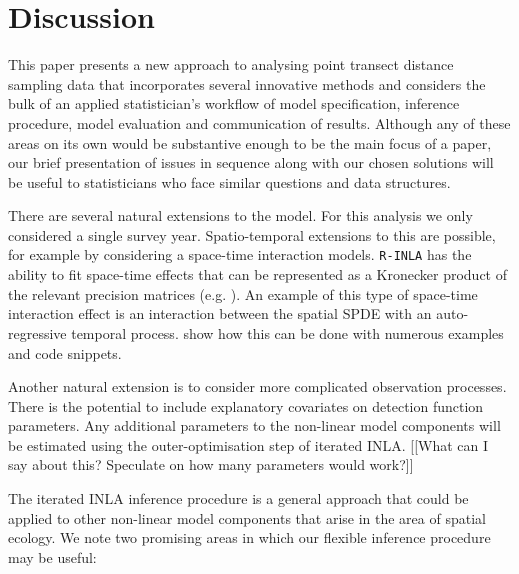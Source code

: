 \documentclass[preprint,12pt]{elsarticle}
\begin{document}
\section{Discussion}

This paper presents a new approach to analysing point transect distance sampling data that incorporates several innovative methods and considers the bulk of an applied statistician's workflow of model specification, inference procedure, model evaluation and communication of results.  Although any of these areas on its own would be substantive enough to be the main focus of a paper, our brief presentation of issues in sequence along with our chosen solutions will be useful to statisticians who face similar questions and data structures.

There are several natural extensions to the model.  For this analysis we only considered a single survey year.  Spatio-temporal extensions to this are possible, for example by considering a space-time interaction models.  \texttt{R-INLA} has the ability to fit space-time effects that can be represented as a Kronecker product of the relevant precision matrices (e.g. \citep{yuan_point_2017}).  An example of this type of space-time interaction effect is an interaction between the spatial SPDE with an auto-regressive temporal process.  \cite{blangiardo_spatial_2013} show how this can be done with numerous examples and code snippets.  

Another natural extension is to consider more complicated observation processes.  There is the potential to include explanatory covariates on detection function parameters. Any additional parameters to the non-linear model components will be estimated using the outer-optimisation step of iterated INLA. [[What can I say about this?  Speculate on how many parameters would work?]]  

The iterated INLA inference procedure is a general approach that could be applied to other non-linear model components that arise in the area of spatial ecology.  We note two promising areas in which our flexible inference procedure may be useful:
\end{document}
